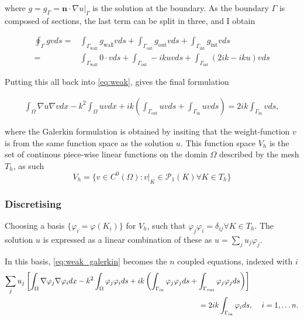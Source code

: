 \documentclass[aps, 12pt]{revtex4}
\begin{document}
where $g = g_{\Gamma} = \mathbf{n}\cdot \nabla u\big |_{\Gamma}$ is the solution at the boundary. As the boundary $\Gamma$ is composed of sections, the last term can be split in three, and I obtain

\begin{align*}
    \oint_{\Gamma}gvds = & \int_{\Gamma_{\text{wall}}}g_{\text{wall}}vds + \int_{\Gamma_{\text{out}}}g_{\text{out}}vds + \int_{\Gamma_{\text{int}}}g_{\text{int}}vds
    \\
    =                    & \int_{\Gamma_{\text{wall}}}0\cdot vds + \int_{\Gamma_{\text{out}}}-ikuvds + \int_{\Gamma_{\text{int}}}(2ik-iku)vds
\end{align*}

Putting this all back into \eqref{eq:weak}, gives the final formulation

\begin{align}\label{eq:weak_galerkin}
    \int_{\Omega}\nabla u\nabla vdx-k^2\int_{\Omega}uvdx+ik\left(\int_{\Gamma_{\text{out}}}uvds+\int_{\Gamma_{\text{in}}}uvds \right) = 2ik\int_{\Gamma_{\text{in}}}vds,
\end{align}

where the Galerkin formulation is obtained by insiting that the weight-function $v$ is from the same function space as the solution $u$. This function space $V_h$ is the set of continous piece-wise linear functions on the domin $\Omega$ described by the mesh $T_h$, as such
\begin{equation}\label{eq:fnspace}
    V_h = \{v\in C^0(\Omega):v|_K\in \mathcal{P}_1(K)\forall K\in T_h  \}
\end{equation}

\subsubsection{Discretising}
Choosing a basis $\{\varphi_i = \varphi(K_i)\}$ for $V_h$, such that $\varphi_j\varphi_i=\delta_{ij} \forall K\in T_h$. The solution $u$ is expressed as a linear combination of these as $u=\sum_ju_j\varphi_j$.

In this basis, \eqref{eq:weak_galerkin} becomes the $n$ coupled equations, indexed with $i$
\begin{align*}
    \sum_ju_j\left[ \int_{\Omega}\nabla \varphi_j\nabla\varphi_idx-k^2\int_{\Omega}\varphi_j\varphi_ids + ik\left(\int_{\Gamma_{\text{in}}}\varphi_j\varphi_jds+\int_{\Gamma_{\text{out}}}\varphi_j\varphi_jds\right) \right] & \\ =2ik\int_{\Gamma_{\text{in}}}\varphi_ids&,
    \hspace{4mm}i=1,\dots n.
\end{align*}
\end{document}
